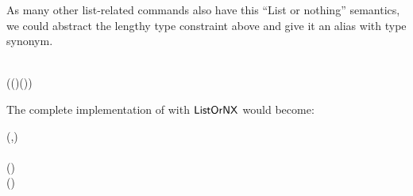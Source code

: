 As many other list-related commands also have this ``List or nothing'' semantics,
 we could abstract the lengthy type constraint above and give it an alias with
 type synonym.

\begin{hscode}\SaveRestoreHook
{}%
%
%
\>[B]{}\;\;\mathrel{=}{}\<[E]%
\\
\>[B]{}\<[5]%
\>[5]{}(\;(\;\;)\mathrel{\vee}\;(\;\;))\mathord{\sim}\<[E]%
\ColumnHook
\end{hscode}\resethooks

The complete implementation of  with
\ensuremath{\Conid{ListOrNX}} would become:

\begin{hscode}\SaveRestoreHook
{}%
%
%
\>[B]{}\mathbin{::}(\;,\;\;){}\<[E]%
\\
\>[B]{}\<[9]%
\>[9]{}\Rightarrow {}\;\<[E]%
\\
\>[B]{}\<[9]%
\>[9]{}\to {}\;\;\;(\;\;){}\<[E]%
\\
\>[B]{}\;\mathrel{=}\mathbin{\$}\;(\;){}\<[E]%
\ColumnHook
\end{hscode}\resethooks
